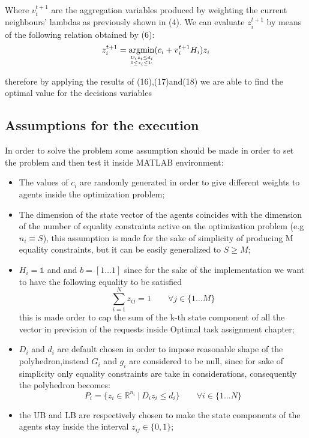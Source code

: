 \documentclass{article}
\DeclareMathOperator*{\argmin}{argmin}
\begin{document}
\noindent Where $v_i^{t+1}$ are the aggregation variables produced by weighting the current neighbours' lambdas as previously shown in (4).
We can evaluate $z_i^{t+1}$ by means of the following relation obtained by (6):
\begin{equation}
    z_i^{t+1} =  \argmin_{ {D_iz_i \leq d_i} \atop 0\leq z_i\leq 1;  } (c_i + v_i^{t+1}H_i)z_i
\end{equation}

therefore by applying the results of (16),(17)and(18) we are able to find the optimal value for the decisions variables

\subsection {Assumptions for the execution}
In order to solve the problem some assumption should be made in order to set the problem and then test it inside MATLAB environment:
\begin{itemize}
    \item The values of $c_i$ are randomly generated in order to give different weights to agents inside the optimization problem;
    \item The dimension of the state vector of the agents coincides with the dimension of the number of equality constraints active on the optimization problem (e.g $n_i\equiv S$), this assumption is made for the sake of simplicity of producing M equality constraints, but it can be easily generalized to $S \geq M $;
    \item $H_i=\mathbb{1}$ and and $b=[1\dots 1]$ since for the sake of the implementation we want to have the following equality to be satisfied 
    \begin{equation*}
    \sum_{i=1}^{N} z_{ij}=1 \qquad \forall j \in \{1\dots M\}
    \end{equation*}
    this is made order to cap the sum of the k-th state component of all the vector in prevision of the requests inside Optimal task assignment chapter;
    \item $D_i$ and $d_i$ are default chosen in order to impose reasonable shape of the polyhedron,instead $G_i$ and $g_i$ are considered to be null, since for sake of simplicity only equality constraints are take in considerations, consequently the polyhedron becomes:
\begin{equation*}
     P_i = \{z_i \in {\mathbb R}^{n_i} \ | \ D_i z_i \leq d_i\} \qquad \forall i \in \{1\dots N\}
\end{equation*}
   \item the UB and LB are respectively chosen to make the state components of the agents stay inside the interval $z_{ij}\in \{0,1\}$; 
\end{itemize}
\end{document}
